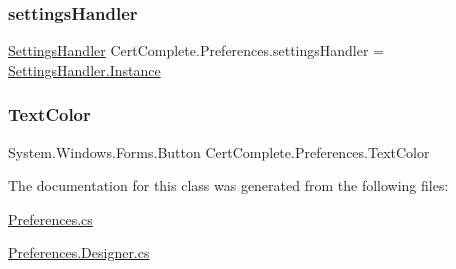\subsubsection{\texorpdfstring{settings\+Handler}{settingsHandler}}
{\footnotesize\ttfamily \mbox{\hyperlink{class_cert_complete_1_1_settings_handler}{Settings\+Handler}} Cert\+Complete.\+Preferences.\+settings\+Handler = \mbox{\hyperlink{class_cert_complete_1_1_settings_handler_a7c4f8eb33b1113986d52942f93e52da8}{Settings\+Handler.\+Instance}}\hspace{0.3cm}{\ttfamily [private]}}

\mbox{\label{class_cert_complete_1_1_preferences_a3f12547699fa6359fe413d8d7ea178f4}} 
\subsubsection{\texorpdfstring{Text\+Color}{TextColor}}
{\footnotesize\ttfamily System.\+Windows.\+Forms.\+Button Cert\+Complete.\+Preferences.\+Text\+Color\hspace{0.3cm}{\ttfamily [private]}}



The documentation for this class was generated from the following files\+:\begin{DoxyCompactItemize}
\item 
\mbox{\hyperlink{_preferences_8cs}{Preferences.\+cs}}\item 
\mbox{\hyperlink{_preferences_8_designer_8cs}{Preferences.\+Designer.\+cs}}\end{DoxyCompactItemize}
